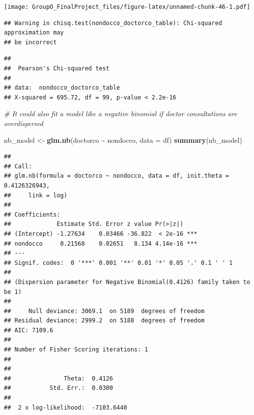 \documentclass[
]{article}
\newenvironment{Shaded}{\begin{snugshade}}{\end{snugshade}}
\newcommand{\AttributeTok}[1]{\textcolor[rgb]{0.13,0.29,0.53}{#1}}
\newcommand{\CommentTok}[1]{\textcolor[rgb]{0.56,0.35,0.01}{\textit{#1}}}
\newcommand{\FunctionTok}[1]{\textcolor[rgb]{0.13,0.29,0.53}{\textbf{#1}}}
\newcommand{\NormalTok}[1]{#1}
\newcommand{\OtherTok}[1]{\textcolor[rgb]{0.56,0.35,0.01}{#1}}
\newcommand{\SpecialCharTok}[1]{\textcolor[rgb]{0.81,0.36,0.00}{\textbf{#1}}}
\begin{document}
\texttt{[image: GroupO\_FinalProject\_files/figure-latex/unnamed-chunk-46-1.pdf]}

\begin{Shaded}
\end{Shaded}

\begin{verbatim}
## Warning in chisq.test(nondocco_doctorco_table): Chi-squared approximation may
## be incorrect
\end{verbatim}

\begin{verbatim}
## 
##  Pearson's Chi-squared test
## 
## data:  nondocco_doctorco_table
## X-squared = 695.72, df = 99, p-value < 2.2e-16
\end{verbatim}

\begin{Shaded}
\begin{Highlighting}[]
\CommentTok{\# It could also fit a model like a negative binomial if doctor consultations are overdispersed}

\NormalTok{nb\_model }\OtherTok{\textless{}{-}} \FunctionTok{glm.nb}\NormalTok{(doctorco }\SpecialCharTok{\textasciitilde{}}\NormalTok{ nondocco, }\AttributeTok{data =}\NormalTok{ df)}
\FunctionTok{summary}\NormalTok{(nb\_model)}
\end{Highlighting}
\end{Shaded}

\begin{verbatim}
## 
## Call:
## glm.nb(formula = doctorco ~ nondocco, data = df, init.theta = 0.4126326943, 
##     link = log)
## 
## Coefficients:
##             Estimate Std. Error z value Pr(>|z|)    
## (Intercept) -1.27634    0.03466 -36.822  < 2e-16 ***
## nondocco     0.21568    0.02651   8.134 4.14e-16 ***
## ---
## Signif. codes:  0 '***' 0.001 '**' 0.01 '*' 0.05 '.' 0.1 ' ' 1
## 
## (Dispersion parameter for Negative Binomial(0.4126) family taken to be 1)
## 
##     Null deviance: 3069.1  on 5189  degrees of freedom
## Residual deviance: 2999.2  on 5188  degrees of freedom
## AIC: 7109.6
## 
## Number of Fisher Scoring iterations: 1
## 
## 
##               Theta:  0.4126 
##           Std. Err.:  0.0300 
## 
##  2 x log-likelihood:  -7103.6440
\end{verbatim}
\end{document}
